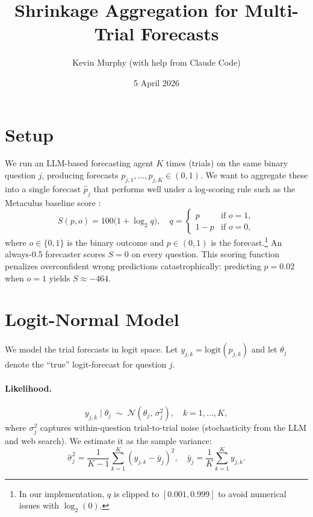 \documentclass[11pt]{article}
\title{Shrinkage Aggregation for Multi-Trial Forecasts}
\author{Kevin Murphy (with help from Claude Code)}
\date{5 April 2026}
\begin{document}
\maketitle

\section{Setup}

We run an LLM-based forecasting agent $K$ times (trials) on the same
binary question $j$, producing forecasts $p_{j,1}, \ldots, p_{j,K} \in (0,1)$.
We want to aggregate these into a single forecast $\hat{p}_j$ that performs
well under a log-scoring rule such as the Metaculus baseline score
\cite{metaculus_scoring}:
\begin{equation}
  S(p, o) = 100 \bigl(1 + \log_2 q\bigr),
  \quad q = \begin{cases} p & \text{if } o=1, \\ 1-p & \text{if } o=0, \end{cases}
\end{equation}
where $o \in \{0,1\}$ is the binary outcome and $p \in (0,1)$ is the forecast.\footnote{%
  In our implementation, $q$ is clipped to $[0.001, 0.999]$ to avoid numerical
  issues with $\log_2(0)$.}
An always-0.5 forecaster scores $S = 0$ on every question.
This scoring function penalizes overconfident wrong predictions catastrophically:
predicting $p=0.02$ when $o=1$ yields $S \approx -464$.

\section{Logit-Normal Model}

We model the trial forecasts in logit space.  Let $y_{j,k} = \mathrm{logit}(p_{j,k})$
and let $\theta_j$ denote the ``true'' logit-forecast for question $j$.

\paragraph{Likelihood.}
\begin{equation}
  y_{j,k} \mid \theta_j \;\sim\; \mathcal{N}(\theta_j,\, \sigma_j^2),
  \quad k = 1, \ldots, K,
\end{equation}
where $\sigma_j^2$ captures within-question trial-to-trial noise (stochasticity
from the LLM and web search).  We estimate it as the sample variance:
\begin{equation}
  \hat{\sigma}_j^2 = \frac{1}{K-1} \sum_{k=1}^{K} (y_{j,k} - \bar{y}_j)^2,
  \quad \bar{y}_j = \frac{1}{K} \sum_{k=1}^{K} y_{j,k}.
\end{equation}
\end{document}
